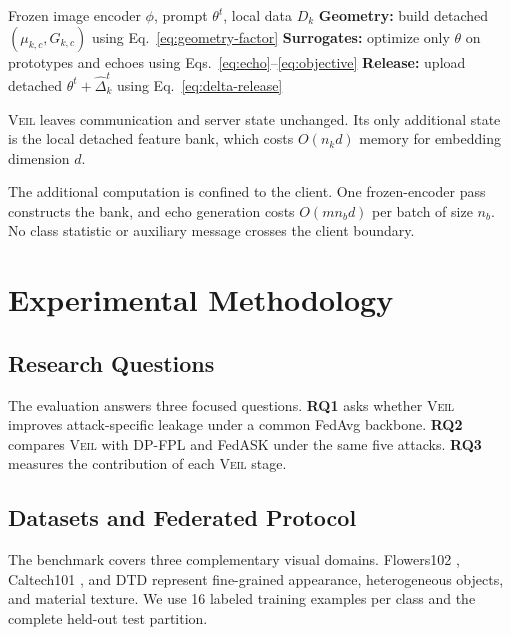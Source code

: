 \documentclass[letterpaper]{article}
\newcommand{\method}{\textsc{Veil}}
\begin{document}
\begin{algorithm}[t]
\caption{Three-Stage \method{} Client Update}
\label{alg:veil}
\begin{algorithmic}[1]
\REQUIRE Frozen image encoder $\phi$, prompt $\theta^t$, local data $D_k$
\STATE \textbf{Geometry:} build detached $(\mu_{k,c},G_{k,c})$ using
Eq.~\eqref{eq:geometry-factor}
\STATE \textbf{Surrogates:} optimize only $\theta$ on prototypes and echoes
using Eqs.~\eqref{eq:echo}--\eqref{eq:objective}
\STATE \textbf{Release:} upload detached $\theta^t+\widehat{\Delta}_k^t$ using
Eq.~\eqref{eq:delta-release}
\end{algorithmic}
\end{algorithm}

\method{} leaves communication and server state unchanged.  Its only additional
state is the local detached feature bank, which costs $O(n_kd)$ memory for
embedding dimension $d$.

The additional computation is confined to the client.  One frozen-encoder pass
constructs the bank, and echo generation costs $O(mn_bd)$ per batch of size
$n_b$.  No class statistic or auxiliary message crosses the client boundary.

\section{Experimental Methodology}

\subsection{Research Questions}

The evaluation answers three focused questions.  \textbf{RQ1} asks whether
\method{} improves attack-specific leakage under a common FedAvg backbone.
\textbf{RQ2} compares \method{} with DP-FPL and FedASK under the same five
attacks.  \textbf{RQ3} measures the contribution of each \method{} stage.

\subsection{Datasets and Federated Protocol}

The benchmark covers three complementary visual domains.  Flowers102
\citep{nilsback2008flowers}, Caltech101 \citep{fei2004caltech}, and DTD
\citep{cimpoi2014dtd} represent fine-grained appearance, heterogeneous objects,
and material texture.  We use 16 labeled training examples per class and the
complete held-out test partition.
\end{document}
